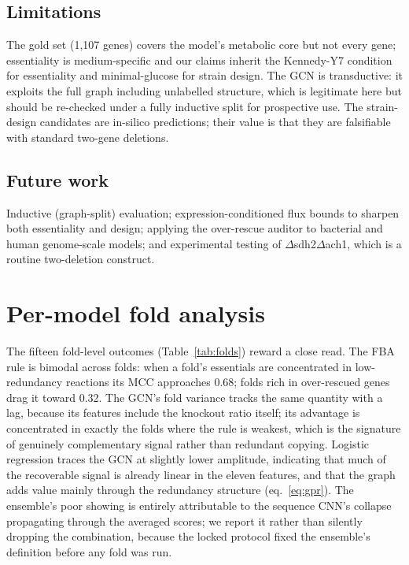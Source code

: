 \documentclass[12pt]{article}
\begin{document}
\subsection{Limitations}
The gold set (1{,}107 genes) covers the model's metabolic core but not
every gene; essentiality is medium-specific and our claims inherit the
Kennedy-Y7 condition for essentiality and minimal-glucose for strain
design. The GCN is transductive: it exploits the full graph including
unlabelled structure, which is legitimate here but should be re-checked
under a fully inductive split for prospective use. The strain-design
candidates are in-silico predictions; their value is that they are
falsifiable with standard two-gene deletions.
\subsection{Future work}
Inductive (graph-split) evaluation; expression-conditioned flux bounds to
sharpen both essentiality and design; applying the over-rescue auditor to
bacterial and human genome-scale models; and experimental testing of
$\Delta$sdh2$\Delta$ach1, which is a routine two-deletion construct.

\section{Per-model fold analysis}
The fifteen fold-level outcomes (Table~\ref{tab:folds}) reward a close
read. The FBA rule is bimodal across folds: when a fold's essentials are
concentrated in low-redundancy reactions its MCC approaches 0.68; folds
rich in over-rescued genes drag it toward 0.32. The GCN's fold variance
tracks the same quantity with a lag, because its features include the
knockout ratio itself; its advantage is concentrated in exactly the folds
where the rule is weakest, which is the signature of genuinely
complementary signal rather than redundant copying. Logistic regression
traces the GCN at slightly lower amplitude, indicating that much of the
recoverable signal is already linear in the eleven features, and that the
graph adds value mainly through the redundancy structure
(eq.~\eqref{eq:gpr}). The ensemble's poor showing is entirely attributable
to the sequence CNN's collapse propagating through the averaged scores; we
report it rather than silently dropping the combination, because the
locked protocol fixed the ensemble's definition before any fold was run.
\end{document}
